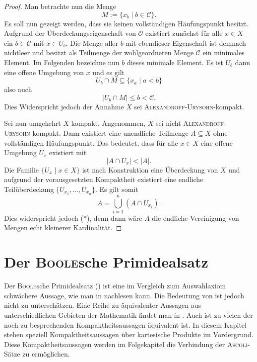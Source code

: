 \begin{proof}
  Man betrachte nun die Menge
  \begin{displaymath}
    M := \{ x_b \mid b \in \mathcal{C} \}.
  \end{displaymath}
  Es soll nun gezeigt werden, dass sie keinen vollständigen Häufungspunkt besitzt. 
  Aufgrund der Überdeckungseigenschaft von $\mathcal{O}$ existiert zunächst für alle $x \in X$ ein $b \in \mathcal{C}$ mit $x \in U_b$.
  Die Menge aller $b$ mit ebendieser Eigenschaft ist demnach nichtleer und besitzt als Teilmenge der wohlgeordneten Menge $\mathcal{C}$ ein minimales Element.
  Im Folgenden bezeichne nun $b$ dieses minimale Element.
  Es ist $U_b$ dann eine offene Umgebung von $x$ und es gilt 
  \begin{displaymath}
    U_b \cap M \subseteq \{x_a \mid a < b\}
  \end{displaymath}
  also auch
  \begin{displaymath}
    |U_b \cap M| \leq b < \mathcal{C}.
  \end{displaymath}
  Dies Widerspricht jedoch der Annahme $X$ sei \textsc{Alexandroff}\hyp{}\textsc{Urysohn}\hyp{}kompakt.

  Sei nun umgekehrt $X$ kompakt.
  Angenommen, $X$ sei nicht \textsc{Alexandroff}\hyp{}\textsc{Urysohn}\hyp{}kompakt.
  Dann existiert eine unendliche Teilmenge $A \subseteq X$ ohne vollständigen Häufungspunkt.
  Das bedeutet, dass für alle $x \in X$ eine offene Umgebung $U_x$ existiert mit
  \begin{displaymath}
    | A \cap U_x | < | A |. \tag{$\ast$}
  \end{displaymath}
  Die Familie $\{U_x \mid x \in X\}$ ist nach Konstruktion eine Überdeckung von $X$ und aufgrund der vorausgesetzten Kompaktheit existiert eine endliche Teilüberdeckung $\{U_{x_1},\dots,U_{x_n}\}$.
  Es gilt somit
  \begin{displaymath}
    A = \bigcup_{i = 1}^n (A \cap U_{x_i}).
  \end{displaymath}
  Dies widerspricht jedoch ($\ast$), denn dann wäre $A$ die endliche Vereinigung von Mengen echt kleinerer Kardinalität. 
\end{proof}

\section{Der \textsc{Boole}sche Primidealsatz}

Der \textsc{Boole}sche Primidealsatz (\PIT) ist eine im Vergleich zum Auswahlaxiom schwächere Aussage, wie man in \cite{halpern1971boolean} nachlesen kann.
Die Bedeutung von \PIT ist jedoch nicht zu unterschätzen. Eine Reihe zu \PIT äquivalenter Aussagen aus unterschiedlichen Gebieten der Mathematik findet man in \cite{dau1994diplom}.
Auch ist \PIT zu vielen der noch zu besprechenden Kompaktheitsaussagen äquivalent ist. 
In diesem Kapitel stehen speziell Kompaktheitsaussagen über kartesische Produkte im Vordergrund. 
Diese Kompaktheitsaussagen werden im Folgekapitel die Verbindung der \textsc{Ascoli}\hyp{}Sätze zu \PIT ermöglichen.

